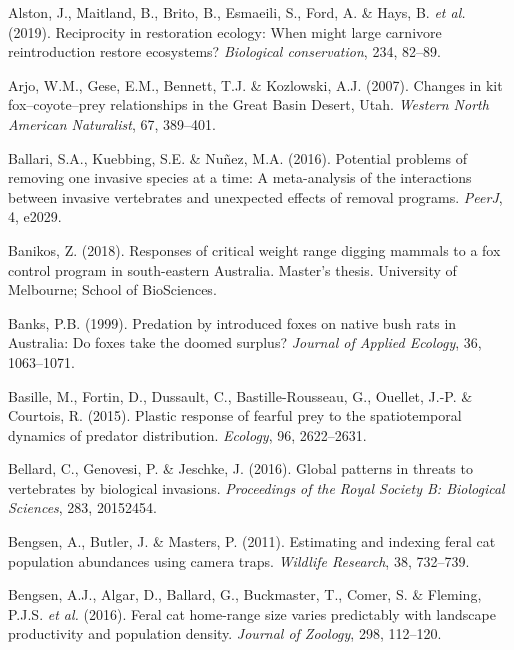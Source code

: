\documentclass[11pt,a4paper,titlepage,twoside,openright]{style/unimelbthesis}
\begin{document}
\begin{mainmatter}
\leavevmode\hypertarget{ref-alston2019reciprocity}{}%
Alston, J., Maitland, B., Brito, B., Esmaeili, S., Ford, A. \& Hays, B. \emph{et al.} (2019). Reciprocity in restoration ecology: When might large carnivore reintroduction restore ecosystems? \emph{Biological conservation}, 234, 82--89.

\leavevmode\hypertarget{ref-arjo2007changes}{}%
Arjo, W.M., Gese, E.M., Bennett, T.J. \& Kozlowski, A.J. (2007). Changes in kit fox--coyote--prey relationships in the Great Basin Desert, Utah. \emph{Western North American Naturalist}, 67, 389--401.

\leavevmode\hypertarget{ref-ballari2016potential}{}%
Ballari, S.A., Kuebbing, S.E. \& Nuñez, M.A. (2016). Potential problems of removing one invasive species at a time: A meta-analysis of the interactions between invasive vertebrates and unexpected effects of removal programs. \emph{PeerJ}, 4, e2029.

\leavevmode\hypertarget{ref-banikos2018responses}{}%
Banikos, Z. (2018). Responses of critical weight range digging mammals to a fox control program in south-eastern Australia. Master's thesis. University of Melbourne; School of BioSciences.

\leavevmode\hypertarget{ref-banks1999predation}{}%
Banks, P.B. (1999). Predation by introduced foxes on native bush rats in Australia: Do foxes take the doomed surplus? \emph{Journal of Applied Ecology}, 36, 1063--1071.

\leavevmode\hypertarget{ref-basille2015plastic}{}%
Basille, M., Fortin, D., Dussault, C., Bastille-Rousseau, G., Ouellet, J.-P. \& Courtois, R. (2015). Plastic response of fearful prey to the spatiotemporal dynamics of predator distribution. \emph{Ecology}, 96, 2622--2631.

\leavevmode\hypertarget{ref-bellard2016global}{}%
Bellard, C., Genovesi, P. \& Jeschke, J. (2016). Global patterns in threats to vertebrates by biological invasions. \emph{Proceedings of the Royal Society B: Biological Sciences}, 283, 20152454.

\leavevmode\hypertarget{ref-bengsen2011estimating}{}%
Bengsen, A., Butler, J. \& Masters, P. (2011). Estimating and indexing feral cat population abundances using camera traps. \emph{Wildlife Research}, 38, 732--739.

\leavevmode\hypertarget{ref-bengsen2016feral}{}%
Bengsen, A.J., Algar, D., Ballard, G., Buckmaster, T., Comer, S. \& Fleming, P.J.S. \emph{et al.} (2016). Feral cat home-range size varies predictably with landscape productivity and population density. \emph{Journal of Zoology}, 298, 112--120.


\end{mainmatter}
\end{document}
